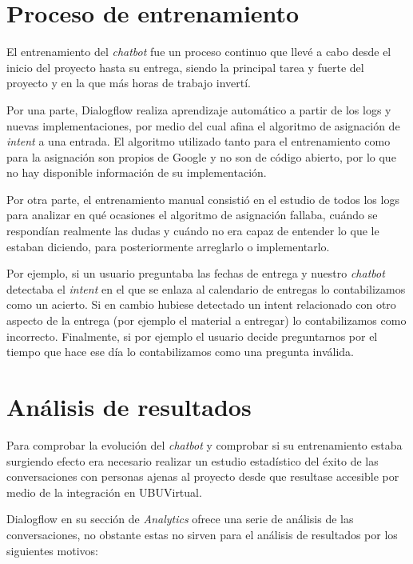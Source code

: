 \newpage
\section{Proceso de entrenamiento}

El entrenamiento del \textit{chatbot} fue un proceso continuo que llevé a cabo desde el inicio del proyecto hasta su entrega, siendo la principal tarea y fuerte del proyecto y en la que más horas de trabajo invertí.

Por una parte, Dialogflow realiza aprendizaje automático a partir de los logs y nuevas implementaciones, por medio del cual afina el algoritmo de asignación de \textit{intent} a una entrada. El algoritmo utilizado tanto para el entrenamiento como para la asignación son propios de Google y no son de código abierto, por lo que no hay disponible información de su implementación.

Por otra parte, el entrenamiento manual consistió en el estudio de todos los logs para analizar en qué ocasiones el algoritmo de asignación fallaba, cuándo se respondían realmente las dudas y cuándo no era capaz de entender lo que le estaban diciendo, para posteriormente arreglarlo o implementarlo.

Por ejemplo, si un usuario preguntaba las fechas de entrega y nuestro \textit{chatbot} detectaba el \textit{intent} en el que se enlaza al calendario de entregas lo contabilizamos como un acierto. Si en cambio hubiese detectado un intent relacionado con otro aspecto de la entrega (por ejemplo el material a entregar) lo contabilizamos como incorrecto. Finalmente, si por ejemplo el usuario decide preguntarnos por el tiempo que hace ese día lo contabilizamos como una pregunta inválida.

\newpage 

\section{Análisis de resultados}

Para comprobar la evolución del \textit{chatbot} y comprobar si su entrenamiento estaba surgiendo efecto era necesario realizar un estudio estadístico del éxito de las conversaciones con personas ajenas al proyecto desde que resultase accesible por medio de la integración en UBUVirtual.

Dialogflow en su sección de \textit{Analytics} ofrece una serie de análisis de las conversaciones, no obstante estas no sirven para el análisis de resultados por los siguientes motivos:

